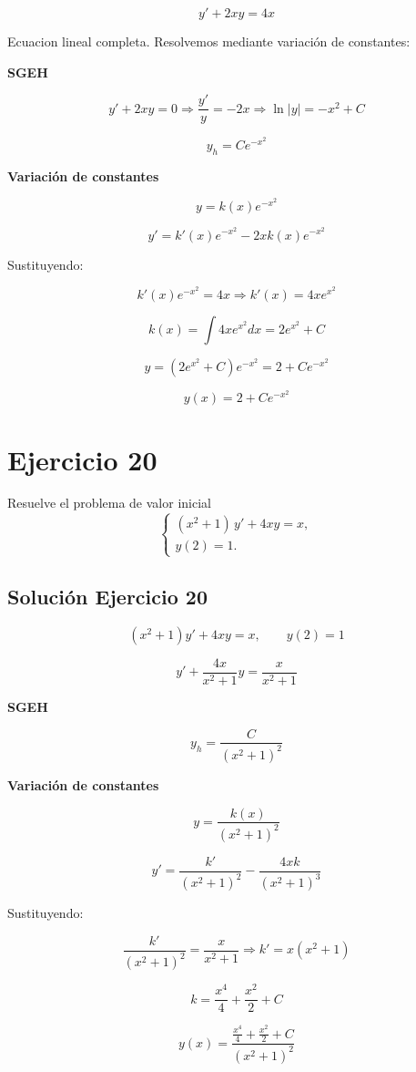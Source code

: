 \documentclass[12pt]{article}
\begin{document}
\[
y' + 2xy = 4x
\]

Ecuacion lineal completa. Resolvemos mediante variación de constantes:

\textbf{SGEH}

\[
y' + 2xy = 0
\Rightarrow
\frac{y'}{y} = -2x
\Rightarrow
\ln|y| = -x^2 + C
\]

\[
y_h = C e^{-x^2}
\]

\textbf{Variación de constantes}

\[
y = k(x)e^{-x^2}
\]

\[
y' = k'(x)e^{-x^2} - 2xk(x)e^{-x^2}
\]

Sustituyendo:

\[
k'(x)e^{-x^2} = 4x
\Rightarrow
k'(x) = 4x e^{x^2}
\]

\[
k(x) = \int 4x e^{x^2} dx = 2 e^{x^2} + C
\]

\[
y = (2e^{x^2}+C)e^{-x^2} = 2 + C e^{-x^2}
\]

\[
\boxed{\,y(x) = 2 + C e^{-x^2}\,}
\]

\section*{Ejercicio 20}
Resuelve el problema de valor inicial
\[
\begin{cases}
(x^2 + 1)\,y' + 4xy = x, \\
y(2) = 1.
\end{cases}
\]

\subsection*{Solución Ejercicio 20}

\[
(x^2+1)y' + 4xy = x,
\qquad y(2)=1
\]

\[
y' + \frac{4x}{x^2+1}y = \frac{x}{x^2+1}
\]

\textbf{SGEH}

\[
y_h = \frac{C}{(x^2+1)^2}
\]

\textbf{Variación de constantes}

\[
y = \frac{k(x)}{(x^2+1)^2}
\]

\[
y' = \frac{k'}{(x^2+1)^2} - \frac{4xk}{(x^2+1)^3}
\]

Sustituyendo:

\[
\frac{k'}{(x^2+1)^2} = \frac{x}{x^2+1}
\Rightarrow
k' = x(x^2+1)
\]

\[
k = \frac{x^4}{4} + \frac{x^2}{2} + C
\]

\[
y(x) = \frac{\frac{x^4}{4}+\frac{x^2}{2}+C}{(x^2+1)^2}
\]
\end{document}
